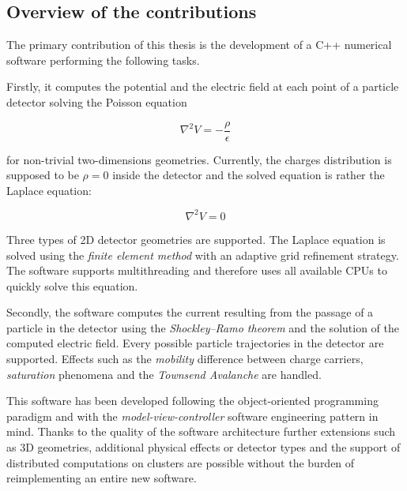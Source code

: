 \documentclass[11pt]{article}
\begin{document}

	\subsection*{Overview of the contributions}

		The primary contribution of this thesis is the development of a C++ numerical software performing the
		following tasks.

		Firstly, it computes the potential and the electric field
		at each point of a particle detector solving the Poisson equation

		\[\nabla^2 V = -\frac{\rho}{\epsilon}\]

		for non-trivial	two-dimensions geometries. Currently, the charges distribution
		is supposed to be $\rho=0$ inside the detector and the solved equation is
		rather the Laplace equation:

		\[\nabla^2 V = 0\]

		Three types of 2D detector geometries are supported.
		The Laplace equation is solved using the \textit{finite element method} with an adaptive
		grid refinement strategy. The software supports multithreading and therefore
		uses all available CPUs to quickly solve this equation.

		Secondly, the software computes the current resulting from the passage of a particle
		in the detector using the \textit{Shockley–Ramo theorem} and the solution of the
		computed electric field. Every possible particle trajectories in the detector
		are supported. Effects such as the \textit{mobility} difference between
		charge carriers, \textit{saturation} phenomena and the
		\textit{Townsend Avalanche} are handled.

		This software has been developed following the object-oriented
		programming paradigm and with the \textit{model-view-controller}
		software engineering pattern in mind. Thanks to the quality of the software
		architecture further extensions such as 3D geometries, additional physical effects or
		detector types and the support of distributed computations on clusters are possible
		without the burden of reimplementing an entire new software.
\end{document}
